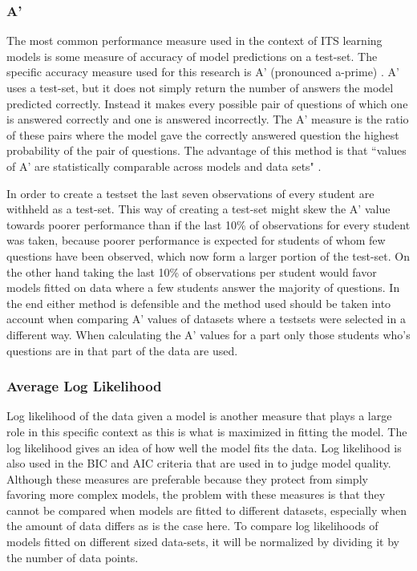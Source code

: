 \documentclass{scrartcl}
\begin{document}
\subsubsection{A'}
The most common performance measure used in the context of ITS learning models is some measure of accuracy of model predictions on a test-set. The specific accuracy measure used for this research is A' (pronounced a-prime) \cite{modelreview}. A' uses a test-set, but it does not simply return the number of answers the model predicted correctly. Instead it makes every possible pair of questions of which one is answered correctly and one is answered incorrectly. The A' measure is the ratio of these pairs where the model gave the correctly answered question the highest probability of the pair of questions. The advantage of this method is that ``values of A' are statistically comparable across models and data sets" \cite{modelreview}.

In order to create a testset the last seven observations of every student are withheld as a test-set. This way of creating a test-set might skew the A' value towards poorer performance than if the last 10\% of observations for every student was taken, because poorer performance is expected for students of whom few questions have been observed, which now form a larger portion of the test-set. On the other hand taking the last 10\% of observations per student would favor models fitted on data where a few students answer the majority of questions. In the end either method is defensible and the method used should be taken into account when comparing A' values of datasets where a testsets were selected in a different way. When calculating the A' values for a part only those students who's questions are in that part of the data are used.

\subsubsection{Average Log Likelihood}
Log likelihood of the data given a model is another measure that plays a large role in this specific context as this is what is maximized in fitting the model. The log likelihood gives an idea of how well the model fits the data. Log likelihood is also used in the BIC and AIC criteria that are used in \cite{lfa} to judge model quality. Although these measures are preferable because they protect from simply favoring more complex models, the problem with these measures is that they cannot be compared when models are fitted to different datasets, especially when the amount of data differs as is the case here. To compare log likelihoods of models fitted on different sized data-sets, it will be normalized by dividing it by the number of data points. 
\end{document}
